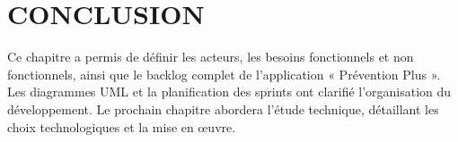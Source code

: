 \section*{CONCLUSION}
\noindent Ce chapitre a permis de définir les acteurs, les besoins fonctionnels et non fonctionnels, ainsi que le backlog complet de l'application « Prévention Plus ». Les diagrammes UML et la planification des sprints ont clarifié l'organisation du développement. Le prochain chapitre abordera l'étude technique, détaillant les choix technologiques et la mise en œuvre.